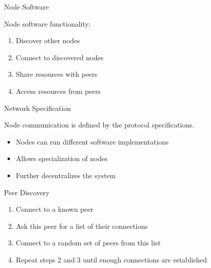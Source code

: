 \documentclass[]{beamer}
\begin{document}
\begin{frame}{Node Software}
	\begin{figure}
		
	\end{figure}
	\vspace{.5 cm}
	Node software functionality:
	\begin{enumerate}
		\item Discover other nodes
		\item<2-> Connect to discovered nodes
		\item<3-> Share resources with peers
		\item<4-> Access resources from peers
	\end{enumerate}
\end{frame}

\begin{frame}{Network Specification}
	\begin{figure}
		
	\end{figure}
	\vspace{.5 cm}
	Node communication is defined by the \color{focus}protocol specifications\color{black}.
	\begin{itemize}
		\item<2-> Nodes can run different software implementations
		\item<3-> Allows specialization of nodes
		\item<3-> \color{focus}Further decentralizes \color{black}the system
	\end{itemize}
\end{frame}

\begin{frame}{Peer Discovery}
	\begin{figure}
		
	\end{figure}
	\begin{enumerate}
		\item<2-> Connect to a known peer
		\item<3-> Ask this peer for a list of their connections
		\item<4-> Connect to a random set of peers from this list
		\item<5-> Repeat steps 2 and 3 until enough connections are established
	\end{enumerate}
\end{frame}
\end{document}
